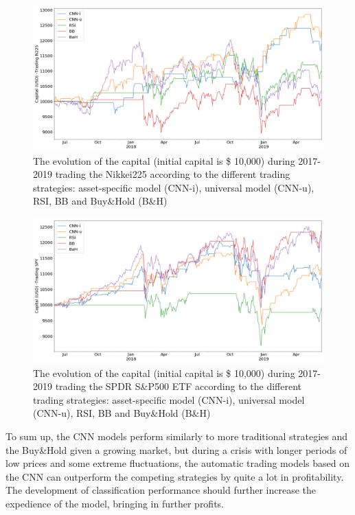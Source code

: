 \documentclass[12pt, a4paper]{article}
\begin{document}
\begin{figure}[H]
    \centering
    \includegraphics[width=.99\textwidth]{images/capitals/Capitals3_N225.png}
    \caption{The evolution of the capital (initial capital is \$ 10,000) during 2017-2019 trading the Nikkei225 according to the different trading strategies: asset-specific model (CNN-i), universal model (CNN-u), RSI, BB and Buy\&Hold (B\&H)}
    \label{fig:P3_N225capevol}
\end{figure}
\begin{figure}[H]
    \centering
    \includegraphics[width=.99\textwidth]{images/capitals/Capitals3_SPY.png}
    \caption{The evolution of the capital (initial capital is \$ 10,000) during 2017-2019 trading the SPDR S\&P500 ETF according to the different trading strategies: asset-specific model (CNN-i), universal model (CNN-u), RSI, BB and Buy\&Hold (B\&H)}
    \label{fig:P3_SPYcapevol}
\end{figure}
To sum up, the CNN models perform similarly to more traditional strategies and the Buy\&Hold given a growing market, but during a crisis with longer periods of low prices and some extreme fluctuations, the automatic trading models based on the CNN can outperform the competing strategies by quite a lot in profitability. The development of classification performance should further increase the expedience of the model, bringing in further profits. 
\end{document}
